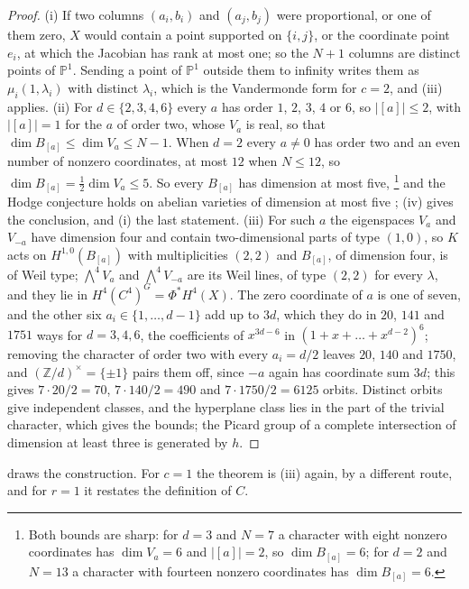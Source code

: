 \documentclass[11pt,reqno]{amsart}
\theoremstyle{plain}
\theoremstyle{definition}
\theoremstyle{remark}
\newcommand{\ZZ}{\mathbb{Z}}
\newcommand{\PP}{\mathbb{P}}
\begin{document}
\begin{proof}
(i) If two columns $(a_{i},b_{i})$ and $(a_{j},b_{j})$ were proportional,
or one of them zero, $X$ would contain a point supported on $\{i,j\}$, or
the coordinate point $e_{i}$, at which the Jacobian has rank at most one;
so the $N+1$ columns are distinct points of $\PP^{1}$. Sending a point of
$\PP^{1}$ outside them to infinity writes them as
$\mu_{i}(1,\lambda_{i})$ with distinct $\lambda_{i}$, which is the
Vandermonde form for $c=2$, and (iii) applies.
(ii) For $d\in\{2,3,4,6\}$ every $a$ has order $1$, $2$, $3$, $4$ or $6$, so
$|[a]|\le2$, with $|[a]|=1$ for the $a$ of order two, whose $V_{a}$ is real,
so that $\dim B_{[a]}\le\dim V_{a}\le N-1$. When $d=2$ every $a\ne0$ has
order two and an even number of nonzero coordinates, at most $12$ when
$N\le12$, so $\dim B_{[a]}=\tfrac12\dim V_{a}\le5$. So every $B_{[a]}$ has
dimension at most five,%
\footnote{Both bounds are sharp: for $d=3$ and $N=7$ a character with eight
nonzero coordinates has $\dim V_{a}=6$ and $|[a]|=2$, so $\dim B_{[a]}=6$;
for $d=2$ and $N=13$ a character with fourteen nonzero coordinates has
$\dim B_{[a]}=6$.} and the Hodge
conjecture holds on abelian varieties of dimension at most five
\cite{Mar25a,Mar25b,MZ99}; (iv) gives the conclusion,
and (i) the last statement.
(iii) For such $a$ the eigenspaces $V_{a}$ and $V_{-a}$ have dimension four
and contain two-dimensional parts of type $(1,0)$, so $K$ acts on
$H^{1,0}(B_{[a]})$ with multiplicities $(2,2)$ and $B_{[a]}$, of dimension
four, is of Weil type; $\bigwedge^{4}V_{a}$ and $\bigwedge^{4}V_{-a}$ are its
Weil lines, of type $(2,2)$ for every $\lambda$, and they lie in
$H^{4}(C^{4})^{G}=\Phi^{*}H^{4}(X)$. The zero coordinate of $a$ is one of
seven, and the other six $a_{i}\in\{1,\dots,d-1\}$ add up to $3d$, which
they do in $20$, $141$ and $1751$ ways for $d=3,4,6$, the coefficients of
$x^{3d-6}$ in $(1+x+\dots+x^{d-2})^{6}$; removing the character of order two
with every $a_{i}=d/2$ leaves $20$, $140$ and $1750$, and $(\ZZ/d)^{\times}=
\{\pm1\}$ pairs them off, since $-a$ again has coordinate sum $3d$; this
gives $7\cdot20/2=70$, $7\cdot140/2=490$ and $7\cdot1750/2=6125$ orbits.
Distinct orbits give independent classes, and the hyperplane class
lies in the part of the trivial character, which gives the bounds; the
Picard group of a complete intersection of dimension at least three is
generated by $h$.
\end{proof}

 draws the construction. For $c=1$ the theorem is (iii) again,
by a different route, and for $r=1$ it restates the definition of $C$.
\end{document}

